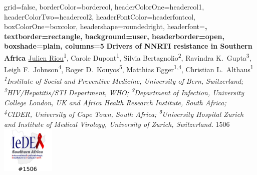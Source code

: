 \documentclass[paperwidth=137.2cm,paperheight=91.4cm]{baposter}
\begin{document}
\begin{poster}{
grid=false,
borderColor=bordercol, %
headerColorOne=headercol1, %
headerColorTwo=headercol2, %
headerFontColor=headerfontcol, %
boxColorOne=boxcolor, %
headershape=roundedright, %
headerfont=\Large\sf\bf, %
textborder=rectangle,
background=user,
headerborder=open, %
boxshade=plain,
columns=5
}
{}
%
%
{\sf\bf \Huge{ Drivers of NNRTI resistance in Southern Africa }\vspace{.1em}} %
{ \underline{Julien Riou}\textsuperscript{1}, Carole Dupont\textsuperscript{1}, Silvia Bertagnolio\textsuperscript{2}, Ravindra K.~Gupta\textsuperscript{3}, Leigh F.~Johnson\textsuperscript{4}, Roger D.~Kouyos\textsuperscript{5}, Matthias Egger\textsuperscript{1,4}, Christian L.~Althaus\textsuperscript{1}\\ \vspace{.2em} %
{\smaller \textit{ \textsuperscript{1}Institute of Social and Preventive Medicine, University of Bern, Switzerland; 
	\textsuperscript{2}HIV/Hepatitis/STI Department, WHO; \textsuperscript{3}Department of Infection, University College London, UK and Africa Health Research Institute, South Africa; \textsuperscript{4}CIDER, University of Cape Town, South Africa;  \textsuperscript{5}University Hospital Zurich and Institute of Medical Virology, University of Zurich, Switzerland. }}} %
{1506\hspace{.5cm} \includegraphics[height=6em]{figures/ideasa2.png} } %



\end{poster}
\end{document}
